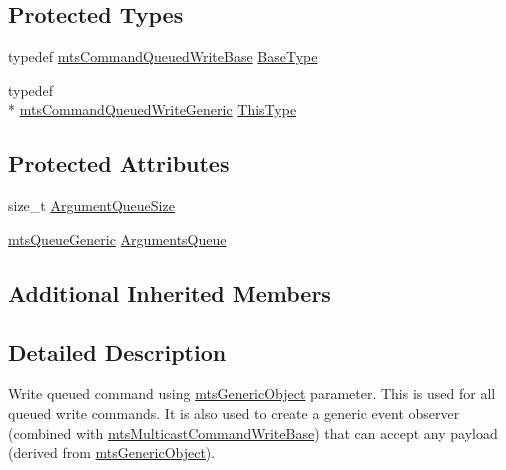 \subsection*{Protected Types}
\begin{DoxyCompactItemize}
\item 
typedef \hyperlink{classmts_command_queued_write_base}{mts\-Command\-Queued\-Write\-Base} \hyperlink{classmts_command_queued_write_generic_aed493b67ec1386ed63d4cfa04c7d8990}{Base\-Type}
\item 
typedef \\*
\hyperlink{classmts_command_queued_write_generic}{mts\-Command\-Queued\-Write\-Generic} \hyperlink{classmts_command_queued_write_generic_a7f9494fd611be623fa3e51a3e12052d6}{This\-Type}
\end{DoxyCompactItemize}
\subsection*{Protected Attributes}
\begin{DoxyCompactItemize}
\item 
size\-\_\-t \hyperlink{classmts_command_queued_write_generic_ad1c8cda6d29a47d37496ed38330530ad}{Argument\-Queue\-Size}
\item 
\hyperlink{classmts_queue_generic}{mts\-Queue\-Generic} \hyperlink{classmts_command_queued_write_generic_aed20ecad144f2e1aa6d26ba37e71e3ea}{Arguments\-Queue}
\end{DoxyCompactItemize}
\subsection*{Additional Inherited Members}


\subsection{Detailed Description}
Write queued command using \hyperlink{classmts_generic_object}{mts\-Generic\-Object} parameter. This is used for all queued write commands. It is also used to create a generic event observer (combined with \hyperlink{classmts_multicast_command_write_base}{mts\-Multicast\-Command\-Write\-Base}) that can accept any payload (derived from \hyperlink{classmts_generic_object}{mts\-Generic\-Object}). 

